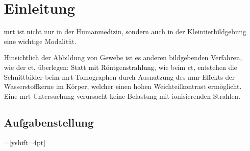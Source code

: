\chapter{Einleitung}

\gls{mrt} ist nicht nur in der Humanmedizin, sondern auch in der Kleintierbildgebung eine wichtige Modalität.

 Hinsichtlich der Abbildung von Gewebe ist es anderen bildgebenden Verfahren, wie der \gls{ct}, überlegen: Statt mit Röntgenstrahlung, wie beim \gls{ct}, entstehen die Schnittbilder beim \gls{mrt}-Tomographen durch Ausnutzung des \gls{nmr}-Effekts der Wasserstoffkerne im Körper, welcher einen hohen Weichteilkontrast ermöglicht. Eine \gls{mrt}-Untersuchung verursacht keine Belastung mit ionisierenden Strahlen.
 
\section{Aufgabenstellung}
=[yshift=4pt]
%

